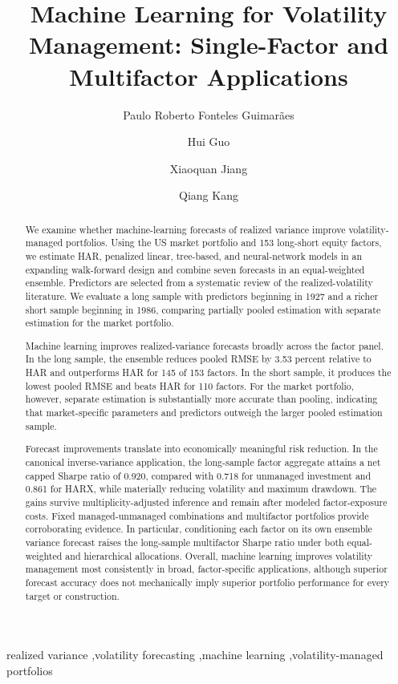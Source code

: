 \documentclass[preprint,12pt,authoryear]{elsarticle}
\begin{document}
\begin{frontmatter}

\title{Machine Learning for Volatility Management: Single-Factor and Multifactor Applications}

\author[unb]{Paulo Roberto Fonteles Guimarães}
\author[unb]{Hui Guo}
\author[unb]{Xiaoquan Jiang}
\author[unb]{Qiang Kang}


\begin{abstract}
	
	We examine whether machine-learning forecasts of realized variance improve volatility-managed portfolios. Using the US market portfolio and 153 long-short equity factors, we estimate HAR, penalized linear, tree-based, and neural-network models in an expanding walk-forward design and combine seven forecasts in an equal-weighted ensemble. Predictors are selected from a systematic review of the realized-volatility literature. We evaluate a long sample with predictors beginning in 1927 and a richer short sample beginning in 1986, comparing partially pooled estimation with separate estimation for the market portfolio.
	
	Machine learning improves realized-variance forecasts broadly across the factor panel. In the long sample, the ensemble reduces pooled RMSE by 3.53 percent relative to HAR and outperforms HAR for 145 of 153 factors. In the short sample, it produces the lowest pooled RMSE and beats HAR for 110 factors. For the market portfolio, however, separate estimation is substantially more accurate than pooling, indicating that market-specific parameters and predictors outweigh the larger pooled estimation sample.
	
	Forecast improvements translate into economically meaningful risk reduction. In the canonical inverse-variance application, the long-sample factor aggregate attains a net capped Sharpe ratio of 0.920, compared with 0.718 for unmanaged investment and 0.861 for HARX, while materially reducing volatility and maximum drawdown. The gains survive multiplicity-adjusted inference and remain after modeled factor-exposure costs. Fixed managed-unmanaged combinations and multifactor portfolios provide corroborating evidence. In particular, conditioning each factor on its own ensemble variance forecast raises the long-sample multifactor Sharpe ratio under both equal-weighted and hierarchical allocations. Overall, machine learning improves volatility management most consistently in broad, factor-specific applications, although superior forecast accuracy does not mechanically imply superior portfolio performance for every target or construction.
	
\end{abstract}

\begin{keyword}
realized variance \sep volatility forecasting \sep machine learning \sep volatility-managed portfolios 
\end{keyword}

\end{frontmatter}
\end{document}
